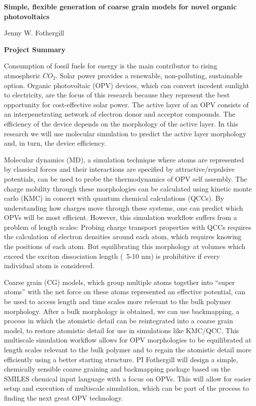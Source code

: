 \documentclass{article}
\begin{document}
\begin{center}
    \large{\textbf{Simple, flexible generation of coarse grain models for novel organic photovoltaics}}
\end{center}
\begin{center}
    Jenny W. Fothergill
\end{center}
\begin{center}
    \textbf{Project Summary}
\end{center}

Consumption of fossil fuels for energy is the main contributor to rising atmospheric $CO_{2}$. 
Solar power provides a renewable, non-polluting, sustainable option.
Organic photovoltaic (OPV) devices, which can convert incedent sunlight to electricity, are the focus of this research because they represent the best opportunity for cost-effective solar power.
The active layer of an OPV consists of an interpenetrating network of electron donor and acceptor compounds.
The efficiency of the device depends on the morphology of the active layer.
In this research we will use molecular simulation to predict the active layer morphology and, in turn, the device efficiency.

Molecular dynamics (MD), a simulation technique where atoms are represented by classical forces and their interactions are specified by attractive/repulsive potentials, can be used to probe the thermodynamics of OPV self assembly.
The charge mobility through these morphologies can be calculated using kinetic monte carlo (KMC) in concert with quantum chemical calculations (QCCs).
By understanding how charges move through these systems, one can predict which OPVs will be most efficient.
However, this simulation workflow suffers from a problem of length scales:
Probing charge transport properties with QCCs requires the calculation of electron densities around each atom, which requires knowing the positions of each atom.
But equilibrating this morphology at volumes which exceed the exciton dissociation length (~5-10 nm) is prohibitive if every individual atom is considered.

Coarse grain (CG) models, which group multiple atoms together into ``super atoms'' with the net force on these atoms represented an effective potential, can be used to access length and time scales more relevant to the bulk polymer morphology.
After a bulk morphology is obtained, we can use backmapping, a process in which the atomistic detail can be reintegrated into a coarse grain model, to restore atomistic detail for use in simulations like KMC/QCC.
This multiscale simulation workflow allows for OPV morphologies to be equilibrated at length scales relevant to the bulk polymer and to regain the atomistic detail more efficiently using a better starting structure.
PI Fothergill will design a simple, chemically sensible coarse graining and backmapping package based on the SMILES chemical input language with a focus on OPVs.
This will allow for easier setup and execution of multiscale simulation, which can be part of the process to finding the next great OPV technology.
\end{document}
